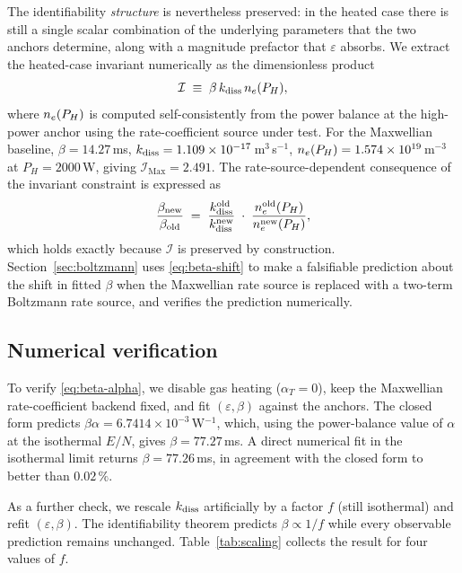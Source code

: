 The identifiability \emph{structure} is nevertheless preserved: in
the heated case there is still a single scalar combination of the
underlying parameters that the two anchors determine, along with a
magnitude prefactor that $\varepsilon$ absorbs. We extract the
heated-case invariant numerically as the dimensionless product
\begin{equation}
  \mathcal{I}
  \;\equiv\;
  \beta\,k_{\mathrm{diss}}\,n_e(P_H),
  \label{eq:invariant-full}
\end{equation}
where $n_e(P_H)$ is computed self-consistently from the power
balance at the high-power anchor using the rate-coefficient source
under test. For the Maxwellian baseline,
$\beta = 14.27$\,ms,
$k_{\mathrm{diss}} = 1.109\times10^{-17}$\,m$^3$\,s$^{-1}$,
$n_e(P_H) = 1.574\times10^{19}$\,m$^{-3}$ at
$P_H = 2000\,$W, giving $\mathcal{I}_{\mathrm{Max}} = 2.491$. The
rate-source-dependent consequence of the invariant constraint is
expressed as
\begin{equation}
  \frac{\beta_{\mathrm{new}}}{\beta_{\mathrm{old}}}
  \;=\;
  \frac{k_{\mathrm{diss}}^{\mathrm{old}}}{k_{\mathrm{diss}}^{\mathrm{new}}}
  \;\cdot\;
  \frac{n_e^{\mathrm{old}}(P_H)}{n_e^{\mathrm{new}}(P_H)},
  \label{eq:beta-shift}
\end{equation}
which holds exactly because $\mathcal{I}$ is preserved by
construction. Section~\ref{sec:boltzmann} uses
\eqref{eq:beta-shift} to make a falsifiable prediction about the
shift in fitted $\beta$ when the Maxwellian rate source is replaced
with a two-term Boltzmann rate source, and verifies the prediction
numerically.

\subsection{Numerical verification}
\label{sec:identifiability:numerics}

To verify \eqref{eq:beta-alpha}, we disable gas heating
($\alpha_T = 0$), keep the Maxwellian rate-coefficient backend
fixed, and fit $(\varepsilon,\beta)$ against the anchors. The
closed form predicts
$\beta\alpha = 6.7414\times10^{-3}\,$W$^{-1}$, which, using the
power-balance value of $\alpha$ at the isothermal $E/N$, gives
$\beta = 77.27\,$ms. A direct numerical fit in the isothermal
limit returns $\beta = 77.26\,$ms, in agreement with the closed
form to better than $0.02\,\%$.

As a further check, we rescale $k_{\mathrm{diss}}$ artificially by a factor
$f$ (still isothermal) and refit $(\varepsilon,\beta)$. The
identifiability theorem predicts $\beta \propto 1/f$ while every
observable prediction remains unchanged.
Table~\ref{tab:scaling} collects the result for four values of $f$.

